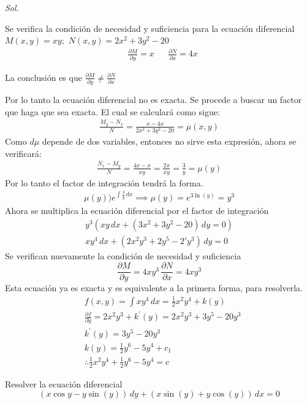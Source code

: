 \textit{ Sol. }

Se verifica la condición de necesidad y suficiencia para la ecuación diferencial 
$M(x,y)=xy;$ $N(x,y)=2x^2+3y^2-20$
\begin{align*}
    &\frac{\partial M}{\partial y}=x&&\frac{\partial N}{\partial x}=4x
\end{align*}

La conclusión es que $\frac{\partial M}{\partial y}\neq \frac{\partial N}{\partial x}$

Por lo tanto la ecuación diferencial no es exacta. Se procede a buscar un factor que haga que sea exacta. El cual se calculará como sigue: 
\begin{align*}
    \frac{M_y-N_x}{N}=\frac{x-4x}{2x^2+3y^2-20}=\mu(x,y)
\end{align*}
Como $d\mu$ depende de dos variables, entonces no sirve esta expresión, ahora se verificará:
\begin{align*}
    \frac{N_x-M_y}{N}=\frac{4x-x}{xy}=\frac{2x}{xy}=\frac{3}{y}=\mu(y)
\end{align*}
Por lo tanto el factor de integración tendrá la forma.
\begin{align*}
    \mu(y))e^{\int \frac{3}{y}\, dx}\implies \mu(y)=e^{3\ln{(y)}}=y^3
\end{align*}
Ahora se multiplica la ecuación diferencial por el factor de integración
\begin{align*}
    y^3\left(xy\, dx+\left(3x^2+3y^2-20\right)\, dy=0\right)\\
    xy^4\, dx+\left(2x^2y^3+2y^5-2'y^3\right)\, dy=0
\end{align*}
Se verifican nuevamente la condición de necesidad y suficiencia
\begin{equation*}
    \frac{\partial M}{\partial y}=4xy^3\, \frac{\partial N}{\partial x}=4xy^3
\end{equation*}
Esta ecuación ya es exacta y es equivalente a la primera forma, para resolverla.
\begin{align*}
    &f(x,y)=\int xy^4\, dx=\frac{1}{2}x^2y^4+k(y)\\
    &\frac{\partial f}{\partial y}=2x^2y^3+k^{\prime}(y)=2x^2y^3+3y^5-20y^3\\
    &k^{\prime}(y)=3y^5-20y^3\\
    &k(y)=\frac{1}{2}y^6-5y^4+c_1\\
    &\therefore \frac{1}{2}x^2y^4+\frac{1}{2}y^6-5y^4=c
\end{align*}

\begin{example}
    Resolver la ecuación diferencial
    \begin{equation*}
    \left( x\cos{y} -y\sin{(y)}\right)\, dy+\left( x\sin{(y)}+y\cos{(y)} \right)\, dx=0
    \end{equation*}
\end{example}


